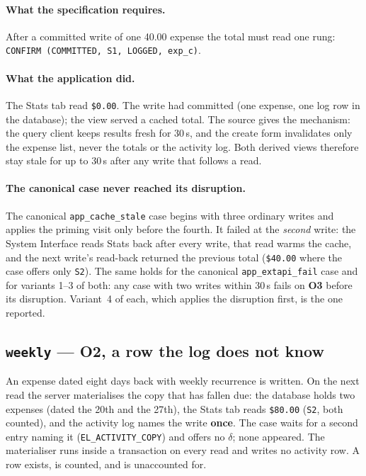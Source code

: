 \documentclass[11pt,a4paper]{article}
\newcommand{\gate}[1]{\texttt{\small #1}}
\newcommand{\obl}[1]{\textbf{O#1}}
\begin{document}
\paragraph{What the specification requires.}
After a committed write of one 40.00 expense the total must read one rung:
\gate{CONFIRM (COMMITTED, S1, LOGGED, exp\_c)}.

\paragraph{What the application did.}
The Stats tab read \texttt{\$0.00}. The write had committed (one expense, one
log row in the database); the view served a cached total. The source gives the
mechanism: the query client keeps results fresh for 30\,s, and the create form
invalidates only the expense list, never the totals or the activity log. Both
derived views therefore stay stale for up to 30\,s after any write that follows
a read.

\paragraph{The canonical case never reached its disruption.}
The canonical \gate{app\_cache\_stale} case begins with three ordinary writes and
applies the priming visit only before the fourth. It failed at the
\emph{second} write: the System Interface reads Stats back after every write,
that read warms the cache, and the next write's read-back returned the previous
total (\texttt{\$40.00} where the case offers only \gate{S2}). The same holds
for the canonical \gate{app\_extapi\_fail} case and for variants 1--3 of both:
any case with two writes within 30\,s fails on \obl{3} before its disruption.
Variant~4 of each, which applies the disruption first, is the one reported.

\medskip
\noindent{}

\subsection{\gate{weekly} --- \obl{2}, a row the log does not know}

An expense dated eight days back with weekly recurrence is written. On the next
read the server materialises the copy that has fallen due: the database holds
two expenses (dated the 20th and the 27th), the Stats tab reads \texttt{\$80.00}
(\gate{S2}, both counted), and the activity log names the write \textbf{once}.
The case waits for a second entry naming it (\gate{EL\_ACTIVITY\_COPY}) and
offers no $\delta$; none appeared. The materialiser runs inside a transaction on
every read and writes no activity row. A row exists, is counted, and is
unaccounted for.
\end{document}
